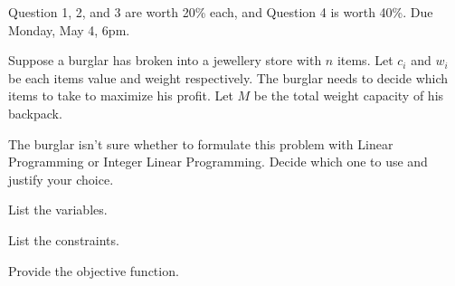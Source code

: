 \documentclass{article}
\begin{document}
\noindent Question 1, 2, and 3 are worth 20\% each, and Question 4 is worth 40\%.
Due Monday, May 4, 6pm.

\begin{Question}
Suppose a burglar has broken into a jewellery store with $n$ items.
Let $c_i$ and $w_i$ be each items value and weight respectively.
The burglar needs to decide which items to take to maximize his profit. Let $M$ be the total weight capacity of his backpack.

\begin{Subquestion}
The burglar isn't sure whether to formulate this problem with Linear Programming or Integer Linear Programming. Decide which one to use and justify your choice.
\begin{makespace}
\vspace{30mm}
\end{makespace}
\end{Subquestion}

\begin{Subquestion}
List the variables.
\begin{makespace}
\vspace{30mm}
\end{makespace}
\end{Subquestion}

\begin{Subquestion}
List the constraints.
\begin{makespace}
\vspace{30mm}
\end{makespace}
\end{Subquestion}

\begin{Subquestion}
Provide the objective function.
\begin{makespace}
\vspace{30mm}
\end{makespace}
\end{Subquestion}
\end{Question}
\end{document}
